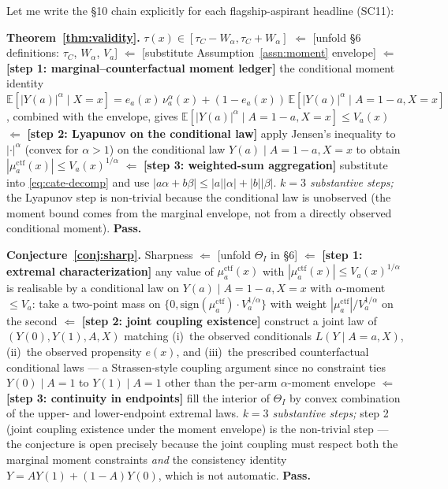 \documentclass[11pt]{article}
\newcommand{\E}{\mathbb{E}}
\theoremstyle{definition}
\theoremstyle{plain}
\theoremstyle{remark}
\begin{document}
Let me write the §10 chain explicitly for each flagship-aspirant headline (SC11):

\textbf{Theorem~\ref{thm:validity}.}
$\tau(x) \in [\tau_C - W_\alpha, \tau_C + W_\alpha]$
$\Leftarrow$ [unfold \S6 definitions: $\tau_C$, $W_\alpha$, $V_a$]
$\Leftarrow$ [substitute Assumption~\ref{assn:moment} envelope]
$\Leftarrow$ \textbf{[step 1: marginal--counterfactual moment ledger]} the conditional moment
identity $\E[|Y(a)|^\alpha \mid X=x] = e_a(x)\,\nu_a^\alpha(x) + (1-e_a(x))\,\E[|Y(a)|^\alpha \mid A=1{-}a, X=x]$,
combined with the envelope, gives $\E[|Y(a)|^\alpha\mid A=1{-}a, X=x] \le V_a(x)$
$\Leftarrow$ \textbf{[step 2: Lyapunov on the conditional law]} apply Jensen's
inequality to $|\cdot|^\alpha$ (convex for $\alpha > 1$) on the conditional law
$Y(a) \mid A=1{-}a, X=x$ to obtain $|\mu_a^{\mathrm{ctf}}(x)| \le V_a(x)^{1/\alpha}$
$\Leftarrow$ \textbf{[step 3: weighted-sum aggregation]} substitute into
\eqref{eq:cate-decomp} and use $|a\alpha+b\beta| \le |a||\alpha| + |b||\beta|$.
\emph{$k = 3$ substantive steps;} the Lyapunov step is non-trivial because the
conditional law is unobserved (the moment bound comes from the marginal envelope,
not from a directly observed conditional moment). \textbf{Pass.}

\textbf{Conjecture~\ref{conj:sharp}.}
Sharpness $\Leftarrow$ [unfold $\Theta_I$ in \S6]
$\Leftarrow$ \textbf{[step 1: extremal characterization]} any value of $\mu_a^{\mathrm{ctf}}(x)$
with $|\mu_a^{\mathrm{ctf}}(x)| \le V_a(x)^{1/\alpha}$ is realisable by a conditional
law on $Y(a)\mid A=1{-}a, X=x$ with $\alpha$-moment $\le V_a$: take a two-point mass
on $\{0, \mathrm{sign}(\mu_a^{\mathrm{ctf}})\cdot V_a^{1/\alpha}\}$ with weight
$|\mu_a^{\mathrm{ctf}}|/V_a^{1/\alpha}$ on the second
$\Leftarrow$ \textbf{[step 2: joint coupling existence]} construct a joint law of
$(Y(0), Y(1), A, X)$ matching (i)~the observed conditionals $L(Y\mid A=a, X)$,
(ii)~the observed propensity $e(x)$, and (iii)~the prescribed counterfactual conditional
laws --- a Strassen-style coupling argument since no constraint ties $Y(0)\mid A=1$ to
$Y(1)\mid A=1$ other than the per-arm $\alpha$-moment envelope
$\Leftarrow$ \textbf{[step 3: continuity in endpoints]} fill the interior of $\Theta_I$
by convex combination of the upper- and lower-endpoint extremal laws.
\emph{$k = 3$ substantive steps;} step 2 (joint coupling existence under the
moment envelope) is the non-trivial step --- the conjecture is open precisely because
the joint coupling must respect both the marginal moment constraints
\emph{and} the consistency identity $Y = AY(1) + (1-A)Y(0)$, which is not automatic.
\textbf{Pass.}
\end{document}
